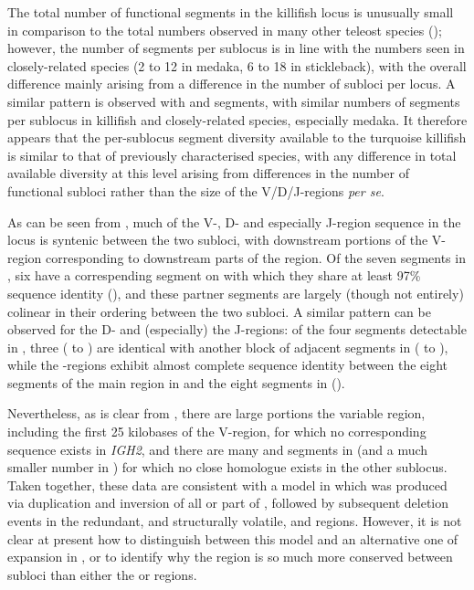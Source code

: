 The total number of functional \vh segments in the killifish locus is unusually small in comparison to the total numbers observed in many other teleost species (); however, the number of segments per sublocus is in line with the numbers seen in closely-related species (2 to 12 in medaka, 6 to 18 in stickleback), with the overall difference mainly arising from a difference in the number of subloci per locus. A similar pattern is observed with \dh and \jh segments, with similar numbers of segments per sublocus in killifish and closely-related species, especially medaka. It therefore appears that the per-sublocus segment diversity available to the turquoise killifish is similar to that of previously characterised species, with any difference in total available diversity at this level arising from differences in the number of functional subloci rather than the size of the V/D/J-regions \textit{per se}.

As can be seen from , much of the V-, D- and especially J-region sequence in the \Nfu locus is syntenic between the two \igh{} subloci, with downstream portions of the  V-region corresponding to downstream parts of the  region. Of the seven \vh segments in , six have a correspending segment on  with which they share at least 97\% sequence identity (), and these partner segments are largely (though not entirely) colinear in their ordering between the two subloci. A similar pattern can be observed for the D- and (especially) the J-regions: of the four \dh segments detectable in , three ( to ) are identical with another block of adjacent \dh segments in  ( to ), while the \jh-regions exhibit almost complete sequence identity between the eight \jh segments of the main \jh region in  and the eight \jh segments in  ().
		
Nevertheless, as is clear from , there are large portions the  variable region, including the first 25 kilobases of the V-region, for which no corresponding sequence exists in \textit{IGH2}, and there are many \vh and \dh segments in  (and a much smaller number in ) for which no close homologue exists in the other sublocus. Taken together, these data are consistent with a model in which  was produced via duplication and inversion of all or part of , followed by subsequent deletion events in the redundant, and structurally volatile,  \vh and \dh regions. However, it is not clear at present how to distinguish between this model and an alternative one of expansion in , or to identify why the \jh region is so much more conserved between subloci than either the \vh or \jh regions.

